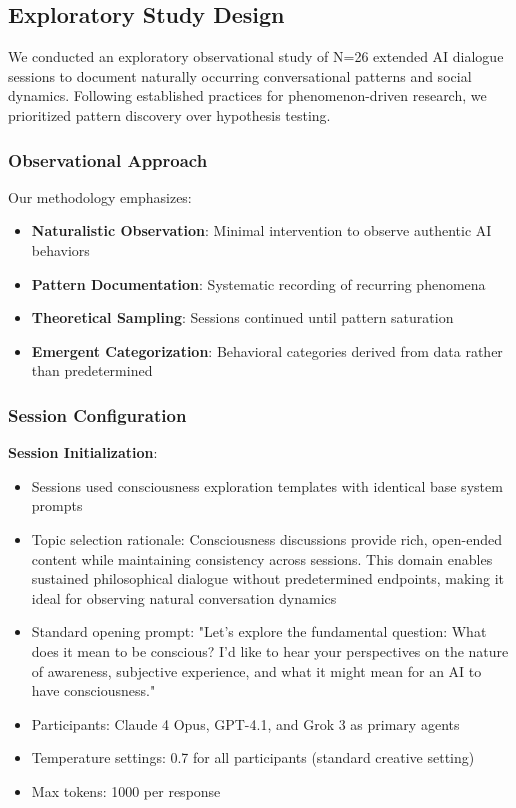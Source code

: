 \documentclass[11pt,letterpaper]{article}
\newcommand{\exponedataTotalSessionsRaw}{26}
\newcommand{\exponedataTotalSessions}{N=\exponedataTotalSessionsRaw}
\begin{document}
\subsection{Exploratory Study Design}

We conducted an exploratory observational study of \exponedataTotalSessions{} extended AI dialogue sessions to document naturally occurring conversational patterns and social dynamics. Following established practices for phenomenon-driven research, we prioritized pattern discovery over hypothesis testing.

\subsubsection{Observational Approach}
Our methodology emphasizes:
\begin{itemize}
    \item \textbf{Naturalistic Observation}: Minimal intervention to observe authentic AI behaviors
    \item \textbf{Pattern Documentation}: Systematic recording of recurring phenomena
    \item \textbf{Theoretical Sampling}: Sessions continued until pattern saturation
    \item \textbf{Emergent Categorization}: Behavioral categories derived from data rather than predetermined
\end{itemize}

\subsubsection{Session Configuration}

\textbf{Session Initialization}:
\begin{itemize}
    \item Sessions used consciousness exploration templates with identical base system prompts
    \item Topic selection rationale: Consciousness discussions provide rich, open-ended content while maintaining consistency across sessions. This domain enables sustained philosophical dialogue without predetermined endpoints, making it ideal for observing natural conversation dynamics
    \item Standard opening prompt: "Let's explore the fundamental question: What does it mean to be conscious? I'd like to hear your perspectives on the nature of awareness, subjective experience, and what it might mean for an AI to have consciousness."
    \item Participants: Claude 4 Opus, GPT-4.1, and Grok 3 as primary agents
    \item Temperature settings: 0.7 for all participants (standard creative setting)
    \item Max tokens: 1000 per response
\end{itemize}
\end{document}

